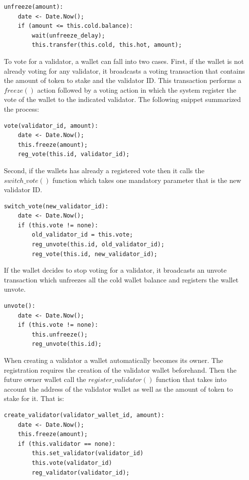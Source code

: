 \documentclass[]{article}
\begin{document}
\begin{lstlisting}[frame=single]
unfreeze(amount):
    date <- Date.Now();
    if (amount <= this.cold.balance):
        wait(unfreeze_delay);
        this.transfer(this.cold, this.hot, amount);
\end{lstlisting}

To vote for a validator, a wallet can fall into two cases. First, if the wallet is not already voting for any validator, it broadcasts a voting transaction that contains the amount of token to stake and the validator ID. This transaction performs a $freeze()$ action followed by a voting action in which the system register the vote of the wallet to the indicated validator. The following snippet summarized the process:

\begin{lstlisting}[frame=single]
vote(validator_id, amount):
    date <- Date.Now();
    this.freeze(amount);
    reg_vote(this.id, validator_id);
\end{lstlisting}

Second, if the wallets has already a registered vote then it calls the $switch\_vote()$ function which takes one mandatory parameter that is the new validator ID. 

\begin{lstlisting}[frame=single]
switch_vote(new_validator_id):
    date <- Date.Now();
    if (this.vote != none):
        old_validator_id = this.vote;
        reg_unvote(this.id, old_validator_id);
        reg_vote(this.id, new_validator_id);
\end{lstlisting}

If the wallet decides to stop voting for a validator, it broadcasts an unvote transaction which unfreezes all the cold wallet balance and registers the wallet unvote. 

\begin{lstlisting}[frame=single]
unvote():
    date <- Date.Now();
    if (this.vote != none):
        this.unfreeze(); 
        reg_unvote(this.id);
\end{lstlisting}

When creating a validator a wallet automatically becomes its owner. The registration requires the creation of the validator wallet beforehand. Then the future owner wallet call the $register\_validator()$ function that takes into account the address of the validator wallet as well as the amount of token to stake for it. That is: 

\begin{lstlisting}[frame=single]
create_validator(validator_wallet_id, amount):
    date <- Date.Now();
    this.freeze(amount);
    if (this.validator == none):
        this.set_validator(validator_id)
        this.vote(validator_id)
        reg_validator(validator_id);
    
\end{lstlisting}
\end{document}
